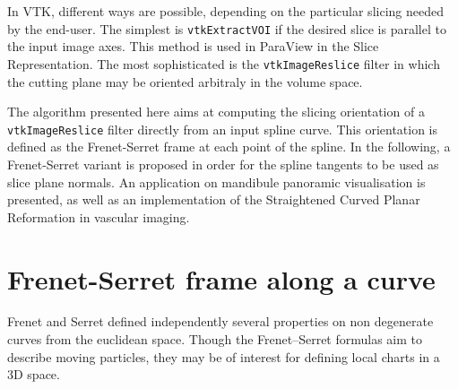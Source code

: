 \documentclass{InsightArticle}
\begin{document}
In VTK, different ways are possible, depending on the particular slicing needed
by the end-user. The simplest is \verb|vtkExtractVOI| if the desired slice is
parallel
to the input image axes. This method is used in ParaView in the Slice 
Representation. The most sophisticated is the \verb|vtkImageReslice| filter in
which
the cutting plane may be oriented arbitraly in the volume space. 

The algorithm presented here aims at computing the slicing orientation of a
\verb|vtkImageReslice| filter directly from an input spline curve. This
orientation
is defined as the Frenet-Serret frame at each point of the spline. In the 
following, a Frenet-Serret variant is proposed in order for the spline tangents
to be used as slice plane normals. An application on mandibule panoramic 
visualisation is presented, as well as an implementation of the Straightened
Curved Planar Reformation in vascular imaging.
%
\section{Frenet-Serret frame along a curve}
Frenet \cite{FRE52} and Serret \cite{SER51} defined independently several
properties on non degenerate curves from the euclidean space. Though the 
Frenet--Serret formulas aim to describe moving particles, they may be of
interest for defining local charts in a 3D space. 
%
\end{document}
